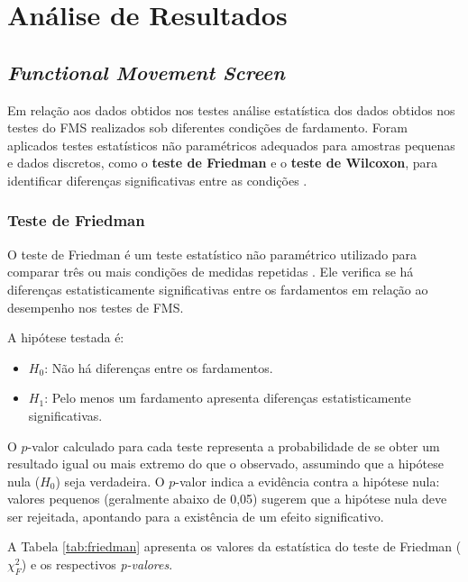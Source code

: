 \chapter{Análise de Resultados}

\section{\textit{Functional Movement Screen}}

    Em relação aos dados obtidos nos testes análise estatística dos dados obtidos nos testes do \acrlong{FMS} realizados sob diferentes condições de fardamento. Foram aplicados testes estatísticos não paramétricos adequados para amostras pequenas e dados discretos, como o \textbf{teste de Friedman} e o \textbf{teste de Wilcoxon}, para identificar diferenças significativas entre as condições \cite{azevedo2018metodos}.

    \subsection{Teste de Friedman}
        O teste de Friedman é um teste estatístico não paramétrico utilizado para comparar três ou mais condições de medidas repetidas \cite{sheldon1996use}. Ele verifica se há diferenças estatisticamente significativas entre os fardamentos em relação ao desempenho nos testes de FMS.

        A hipótese testada é:
        \begin{itemize}
            \item $H_0$: Não há diferenças entre os fardamentos.
            \item $H_1$: Pelo menos um fardamento apresenta diferenças estatisticamente significativas.
            \end{itemize}
        
            O $p$-valor calculado para cada teste representa a probabilidade de se obter um resultado 
            igual ou mais extremo do que o observado, assumindo que a hipótese nula ($H_0$) seja verdadeira. 
            O $p$-valor indica a evidência contra a hipótese nula: valores pequenos (geralmente 
            abaixo de 0,05) sugerem que a hipótese nula deve ser rejeitada, apontando para a existência de um 
            efeito significativo.

        A Tabela \ref{tab:friedman} apresenta os valores da estatística do teste de Friedman ($\chi^2_F$) e os respectivos \textit{p-valores}.


